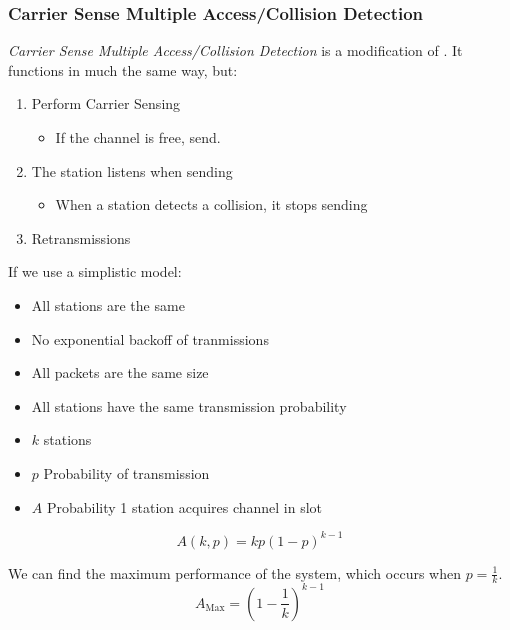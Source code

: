 \subsubsection{Carrier Sense Multiple Access/Collision Detection}\label{subsubsec:CSMACD}
\begin{definition}\label{def:CSMACD}
  \emph{Carrier Sense Multiple Access/Collision Detection} is a modification of .
  It functions in much the same way, but:
  \begin{enumerate}[noitemsep]
  \item Perform Carrier Sensing
    \begin{itemize}[noitemsep]
    \item If the channel is free, send.
    \end{itemize}

  \item The station listens when sending
    \begin{itemize}[noitemsep]
    \item When a station detects a collision, it stops sending
    \end{itemize}

  \item Retransmissions
  \end{enumerate}
\end{definition}

If we use a simplistic model:
\begin{itemize}[noitemsep]
\item All stations are the same
\item No exponential backoff of tranmissions
\item All packets are the same size
\item All stations have the same transmission probability
\item $k$ stations
\item $p$ Probability of transmission
\item $A$ Probability 1 station acquires channel in slot
\end{itemize}

\begin{equation}\label{eq:CSMACD_Performance}
  A(k, p) = kp{(1-p)}^{k-1}
\end{equation}

We can find the maximum performance of the system, which occurs when $p=\frac{1}{k}$.
\begin{equation}\label{eq:CSMACD_Max_Performance}
  A_{\mathrm{Max}} = {(1-\frac{1}{k})}^{k-1}
\end{equation}

